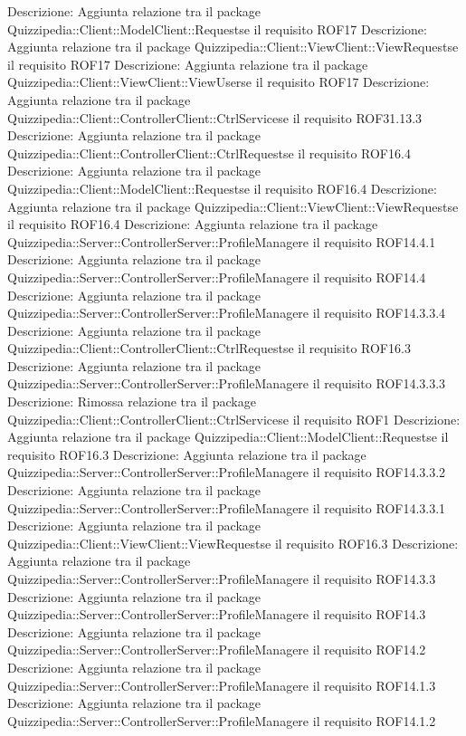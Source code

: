 Descrizione: Aggiunta relazione tra il package Quizzipedia::Client::ModelClient::Requestse il requisito ROF17 
Descrizione: Aggiunta relazione tra il package Quizzipedia::Client::ViewClient::ViewRequestse il requisito ROF17 
Descrizione: Aggiunta relazione tra il package Quizzipedia::Client::ViewClient::ViewUserse il requisito ROF17 
Descrizione: Aggiunta relazione tra il package Quizzipedia::Client::ControllerClient::CtrlServicese il requisito ROF31.13.3 
Descrizione: Aggiunta relazione tra il package Quizzipedia::Client::ControllerClient::CtrlRequestse il requisito ROF16.4 
Descrizione: Aggiunta relazione tra il package Quizzipedia::Client::ModelClient::Requestse il requisito ROF16.4 
Descrizione: Aggiunta relazione tra il package Quizzipedia::Client::ViewClient::ViewRequestse il requisito ROF16.4 
Descrizione: Aggiunta relazione tra il package Quizzipedia::Server::ControllerServer::ProfileManagere il requisito ROF14.4.1 
Descrizione: Aggiunta relazione tra il package Quizzipedia::Server::ControllerServer::ProfileManagere il requisito ROF14.4 
Descrizione: Aggiunta relazione tra il package Quizzipedia::Server::ControllerServer::ProfileManagere il requisito ROF14.3.3.4 
Descrizione: Aggiunta relazione tra il package Quizzipedia::Client::ControllerClient::CtrlRequestse il requisito ROF16.3 
Descrizione: Aggiunta relazione tra il package Quizzipedia::Server::ControllerServer::ProfileManagere il requisito ROF14.3.3.3 
Descrizione: Rimossa relazione tra il package Quizzipedia::Client::ControllerClient::CtrlServicese il requisito ROF1 
Descrizione: Aggiunta relazione tra il package Quizzipedia::Client::ModelClient::Requestse il requisito ROF16.3 
Descrizione: Aggiunta relazione tra il package Quizzipedia::Server::ControllerServer::ProfileManagere il requisito ROF14.3.3.2 
Descrizione: Aggiunta relazione tra il package Quizzipedia::Server::ControllerServer::ProfileManagere il requisito ROF14.3.3.1 
Descrizione: Aggiunta relazione tra il package Quizzipedia::Client::ViewClient::ViewRequestse il requisito ROF16.3 
Descrizione: Aggiunta relazione tra il package Quizzipedia::Server::ControllerServer::ProfileManagere il requisito ROF14.3.3 
Descrizione: Aggiunta relazione tra il package Quizzipedia::Server::ControllerServer::ProfileManagere il requisito ROF14.3 
Descrizione: Aggiunta relazione tra il package Quizzipedia::Server::ControllerServer::ProfileManagere il requisito ROF14.2 
Descrizione: Aggiunta relazione tra il package Quizzipedia::Server::ControllerServer::ProfileManagere il requisito ROF14.1.3 
Descrizione: Aggiunta relazione tra il package Quizzipedia::Server::ControllerServer::ProfileManagere il requisito ROF14.1.2 
